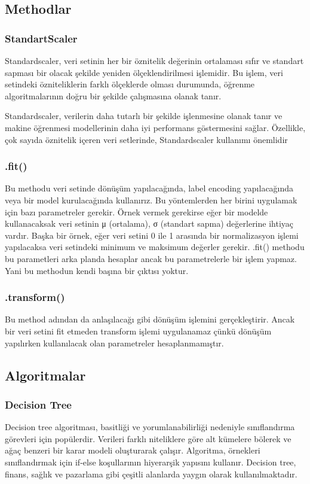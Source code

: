 \documentclass{article}
\begin{document}
\subsection{Methodlar}
\subsubsection{StandartScaler}
Standardscaler, veri setinin her bir öznitelik değerinin ortalaması sıfır ve standart sapması bir olacak şekilde yeniden ölçeklendirilmesi işlemidir. Bu işlem, veri setindeki özniteliklerin farklı ölçeklerde olması durumunda, öğrenme algoritmalarının doğru bir şekilde çalışmasına olanak tanır.

Standardscaler, verilerin daha tutarlı bir şekilde işlenmesine olanak tanır ve makine öğrenmesi modellerinin daha iyi performans göstermesini sağlar. Özellikle, çok sayıda öznitelik içeren veri setlerinde, Standardscaler kullanımı önemlidir\cite{SS}

\subsubsection{.fit()}
Bu methodu veri setinde dönüşüm yapılacağında, label encoding yapılacağında veya bir model kurulacağında kullanırız. Bu yöntemlerden her birini uygulamak için bazı parametreler gerekir. Örnek vermek gerekirse eğer bir modelde kullanacaksak veri setinin μ (ortalama), σ (standart sapma) değerlerine ihtiyaç vardır. Başka bir örnek, eğer veri setini 0 ile 1 arasında bir normalizasyon işlemi yapılacaksa veri setindeki minimum ve maksimum değerler gerekir. .fit() methodu bu parametleri arka planda hesaplar ancak bu parametrelerle bir işlem yapmaz. Yani bu methodun kendi başına bir çıktısı yoktur.

\subsubsection{.transform()}
Bu method adından da anlaşılacağı gibi dönüşüm işlemini gerçekleştirir. Ancak bir veri setini fit etmeden transform işlemi uygulanamaz çünkü dönüşüm yapılırken kullanılacak olan parametreler hesaplanmamıştır\cite{Method}.

\subsection{Algoritmalar}
\subsubsection{Decision Tree}
Decision tree algoritması, basitliği ve yorumlanabilirliği nedeniyle sınıflandırma görevleri için popülerdir. Verileri farklı niteliklere göre alt kümelere bölerek ve ağaç benzeri bir karar modeli oluşturarak çalışır. Algoritma, örnekleri sınıflandırmak için if-else koşullarının hiyerarşik yapısını kullanır. Decision tree, finans, sağlık ve pazarlama gibi çeşitli alanlarda yaygın olarak kullanılmaktadır.
\end{document}
